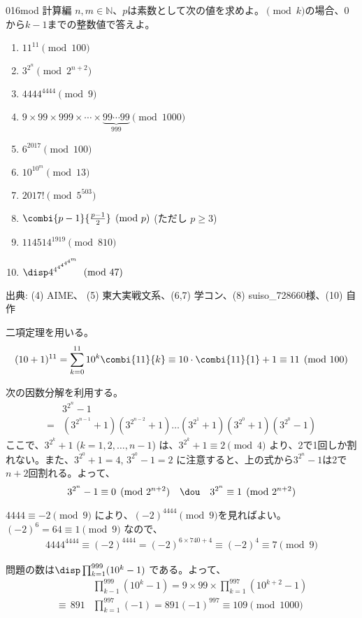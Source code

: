 \begin{thm}{016}{}{mod 計算編}
 $n,m\in\mathbb{N}$、$p$は素数として次の値を求めよ。$\pmod k$の場合、$0$から$k-1$までの整数値で答えよ。
 \begin{enumerate}
  \item $11^{11} \pmod {100}$
  \item $3^{2^n} \pmod {2^{n+2}}$
  \item $4444^{4444} \pmod 9$
  \item $9\times99\times999\times\cdots\times\underbrace{99\cdots99}_{999} \pmod {1000}$
  \item $6^{2017} \pmod {100}$
  \item $10^{10^m} \pmod {13}$
  \item $2017! \pmod 5^{503}$
  \item $\combi{p-1}{\frac{p-1}{2}} \pmod{p}$ (ただし $p\ge 3$)
  \item $114514^{1919} \pmod {810}$
  \item $\disp 4^{4^{4^{4^{4^{4^m}}}}} \pmod {47}$
 \end{enumerate}
 {\small 出典: (4) AIME、 (5) 東大実戦文系、(6,7) 学コン、(8) suiso\_728660様、(10) 自作}
\end{thm}

二項定理を用いる。
\begin{align*}
 (10+1)^{11}=\sum_{k=0}^{11}10^k \combi{11}{k}\equiv 10\cdot\combi{11}{1}+1\equiv 11 \pmod{100}
\end{align*}

次の因数分解を利用する。
\begin{align*}
 &3^{2^n}-1 \\
=&\left(3^{2^{n-1}}+1\right)\left(3^{2^{n-2}}+1\right)\dots\left(3^{2^1}+1\right)\left(3^{2^0}+1\right)\left(3^{2^0}-1\right)
\end{align*}
ここで、$3^{2^k}+1$ ($k=1, 2, \dots , n-1$) は、$3^{2^k}+1\equiv 2 \pmod{4}$ より、2で1回しか割れない。また、$3^{2^0}+1=4$, $3^{2^0}-1=2$ に注意すると、上の式から$3^{2^n}-1$は2で$n+2$回割れる。よって、
\[ 3^{2^n}-1\equiv 0 \pmod{2^{n+2}} \quad\dou\quad 3^{2^n}\equiv 1 \pmod{2^{n+2}} \]

$4444\equiv -2 \pmod{9}$ により、$(-2)^{4444} \pmod{9}$を見ればよい。$(-2)^6=64\equiv 1 \pmod{9}$ なので、
\begin{align*}
 4444^{4444}\equiv (-2)^{4444}=(-2)^{6\times 740+4}\!\equiv (-2)^4\equiv 7 \pmod{9}
\end{align*}

問題の数は$\disp \prod_{k=1}^{999} (10^k-1)$ である。よって、
\begin{align*}
 &\prod_{k-1}^{999}(10^k-1)=9\times 99\times \prod_{k=1}^{997}(10^{k+2}-1) \\
 \equiv \, 891&\prod_{k=1}^{997}(-1)=891(-1)^{997}\equiv 109 \pmod{1000}
\end{align*}

